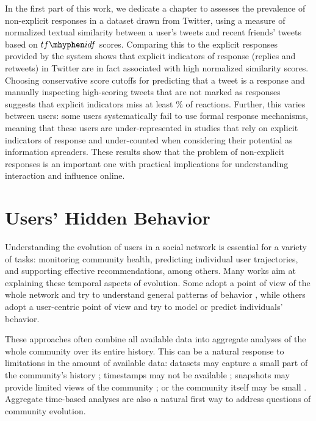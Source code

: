In the first part of this work, we dedicate a chapter to assesses the prevalence of non-explicit responses in a dataset drawn from Twitter, using a measure of normalized textual similarity between a user's tweets and recent friends' tweets based on $tf\mhyphen idf$ scores.  Comparing this to the explicit responses provided by the system shows that explicit indicators of response (replies and retweets) in Twitter are in fact associated with high normalized similarity scores.  Choosing conservative score cutoffs for predicting that a tweet is a response and manually inspecting high-scoring tweets that are not marked as responses suggests that explicit indicators miss at least \highNonTaggedTweetCountPct{}\% of reactions. 
Further, this varies between users: some users systematically fail to use formal response mechanisms, meaning that these users are under-represented in studies that rely on explicit indicators of response and under-counted when considering their potential as information spreaders. These results show that the problem of non-explicit responses is an important one with practical implications for understanding interaction and influence online.

\section{Users' Hidden Behavior}

Understanding the evolution of users in a social network is essential for a variety of tasks: monitoring community health, predicting individual user trajectories, and supporting effective recommendations, among others.  Many works aim at explaining these temporal aspects of evolution. Some adopt a point of view of the whole network and try to understand general patterns of behavior \cite{Zhu2014, Kooti2010}, while others adopt a user-centric point of view and try to model \cite{Correa2010, Priedhorsky2007, Panciera2009, Welser2011} or predict \cite{Danescu-niculescu-mizil2013} individuals' behavior.

These approaches often combine all available data into aggregate analyses of the whole community over its entire history.  This can be a natural response to limitations in the amount of available data:  datasets may capture a small part of the community's history \cite{Artzi2012}; timestamps may not be available \cite{Priedhorsky2007, Pujol2010}; snapshots may provide limited views of the community \cite{Cosley2010}; or the community itself may be small \cite{Lewis2008}.  Aggregate time-based analyses are also a natural first way to address questions of community evolution.

